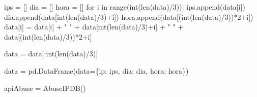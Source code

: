 \documentclass[
  letterpaper,
  DIV=11,
  numbers=noendperiod]{scrartcl}
\newenvironment{Shaded}{\begin{snugshade}}{\end{snugshade}}
\newcommand{\BuiltInTok}[1]{\textcolor[rgb]{0.00,0.23,0.31}{#1}}
\newcommand{\ControlFlowTok}[1]{\textcolor[rgb]{0.00,0.23,0.31}{#1}}
\newcommand{\DecValTok}[1]{\textcolor[rgb]{0.68,0.00,0.00}{#1}}
\newcommand{\KeywordTok}[1]{\textcolor[rgb]{0.00,0.23,0.31}{#1}}
\newcommand{\NormalTok}[1]{\textcolor[rgb]{0.00,0.23,0.31}{#1}}
\newcommand{\OperatorTok}[1]{\textcolor[rgb]{0.37,0.37,0.37}{#1}}
\newcommand{\StringTok}[1]{\textcolor[rgb]{0.13,0.47,0.30}{#1}}
\begin{document}
\begin{Shaded}
\begin{Highlighting}[]
\NormalTok{ips }\OperatorTok{=}\NormalTok{ []}
\NormalTok{dia }\OperatorTok{=}\NormalTok{ []}
\NormalTok{hora }\OperatorTok{=}\NormalTok{ []}
\ControlFlowTok{for}\NormalTok{ i }\KeywordTok{in} \BuiltInTok{range}\NormalTok{(}\BuiltInTok{int}\NormalTok{(}\BuiltInTok{len}\NormalTok{(data)}\OperatorTok{/}\DecValTok{3}\NormalTok{)):}
\NormalTok{    ips.append(data[i])}
\NormalTok{    dia.append(data[}\BuiltInTok{int}\NormalTok{(}\BuiltInTok{len}\NormalTok{(data)}\OperatorTok{/}\DecValTok{3}\NormalTok{)}\OperatorTok{+}\NormalTok{i])}
\NormalTok{    hora.append(data[(}\BuiltInTok{int}\NormalTok{(}\BuiltInTok{len}\NormalTok{(data)}\OperatorTok{/}\DecValTok{3}\NormalTok{))}\OperatorTok{*}\DecValTok{2}\OperatorTok{+}\NormalTok{i])}
\NormalTok{    data[i] }\OperatorTok{=}\NormalTok{ data[i] }\OperatorTok{+} \StringTok{" "} \OperatorTok{+}\NormalTok{ data[}\BuiltInTok{int}\NormalTok{(}\BuiltInTok{len}\NormalTok{(data)}\OperatorTok{/}\DecValTok{3}\NormalTok{)}\OperatorTok{+}\NormalTok{i] }\OperatorTok{+} \StringTok{" "} \OperatorTok{+}\NormalTok{ data[(}\BuiltInTok{int}\NormalTok{(}\BuiltInTok{len}\NormalTok{(data)}\OperatorTok{/}\DecValTok{3}\NormalTok{))}\OperatorTok{*}\DecValTok{2}\OperatorTok{+}\NormalTok{i]}
\end{Highlighting}
\end{Shaded}

\begin{Shaded}
\begin{Highlighting}[]
\NormalTok{data }\OperatorTok{=}\NormalTok{ data[:}\BuiltInTok{int}\NormalTok{(}\BuiltInTok{len}\NormalTok{(data)}\OperatorTok{/}\DecValTok{3}\NormalTok{)]}
\end{Highlighting}
\end{Shaded}

\begin{Shaded}
\begin{Highlighting}[]
\NormalTok{data }\OperatorTok{=}\NormalTok{ pd.DataFrame(data}\OperatorTok{=}\NormalTok{\{}\StringTok{\textquotesingle{}ip\textquotesingle{}}\NormalTok{: ips,}
                       \StringTok{\textquotesingle{}dia\textquotesingle{}}\NormalTok{: dia,}
                       \StringTok{\textquotesingle{}hora\textquotesingle{}}\NormalTok{: hora\})}
\end{Highlighting}
\end{Shaded}

\begin{Shaded}
\begin{Highlighting}[]
\NormalTok{apiAbuse }\OperatorTok{=}\NormalTok{ AbuseIPDB()}
\end{Highlighting}
\end{Shaded}
\end{document}
